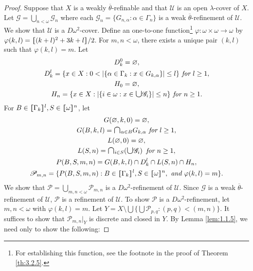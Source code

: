\documentclass[main.tex]{subfiles}
\begin{document}
\begin{proof}
Suppose that $X$ is a weakly $\overline{\theta}$-refinable 
and that $\mathscr{U}$ is an open $\lambda$-cover of $X$. 
Let $\mathscr{G} = \bigcup_{n<\omega} \mathscr{G}_n$ where each 
$\mathscr{G}_n = \{G_{n,\alpha}: \alpha \in \Gamma_n\}$ is a weak 
$\overline{\theta}$-refinement of $\mathscr{U}$.
 We show that $\mathscr{U}$ is a $D\omega^2$-cover. 
 Define an one-to-one function\footnote{For establishing this function, see the footnote 
 	in the proof of Theorem \ref{th:3.2.5}.} 
 $\varphi: \omega \times \omega \to \omega$ by 
 $\varphi(k, l) = \hstretch{1.8}{[}(k+l)^2 +3k+l\hstretch{1.8}{]}/2$.
For $m,n < \omega$, there exists a unique pair $(k, l)$ such that $\varphi(k, l) = m$.
Let
\begin{gather*}
D_k^0 = \varnothing, \\
D_k^l = \{x\in X: 0 < |\{\alpha\in \Gamma_k: x\in G_{k, \alpha}\}| \le l\} \textit { for } l \ge 1, \\
H_0 = \varnothing, \\
H_n = \{x\in X: |\{i \in \omega: x\in \raisebox{-1pt}{\scalebox{1.5}{$\cup$}}\mathscr{G}_i\}| \le n\} 
	  \textit { for } n \ge 1. 
\end{gather*}
For $B\in \hstretch{1.8}{[}\Gamma_k\hstretch{1.8}{]}^l, S\in\hstretch{1.8}{[}\omega\hstretch{1.8}{]}^n$, let
\begin{gather*}
	G(\varnothing, k, 0) = \varnothing, \\
	G(B, k, l) = \raisebox{-1pt}{\scalebox{1.5}{$\cap$}}_{\alpha\in B} G_{k, \alpha} \textit{ for } l \ge 1, \\
	L(\varnothing, 0) = \varnothing, \\
	L(S, n) = \raisebox{-1pt}{\scalebox{1.5}{$\cap$}}_{i\in S} (\raisebox{-1pt}{\scalebox{1.5}{$\cup$}} \mathscr{G}_i) \, \textit{ for } n \ge 1, \\
	P(B, S, m, n) = G(B, k, l) \cap D_k^l \cap L(S, n) \cap H_n, \\
	\mathscr{P}_{m, n} = \{P(B, S, m, n): B\in \hstretch{1.8}{[}\Gamma_k\hstretch{1.8}{]}^l, 
	   S\in\hstretch{1.8}{[}\omega\hstretch{1.8}{]}^n, \textit{ and } \varphi(k, l) = m\}.
\end{gather*}
We show that $\mathscr{P} = \bigcup_{m,n<\omega} \mathscr{P}_{m,n}$ is a 
$D\omega^2$-refinement of $\mathscr{U}$.
 Since $\mathscr{G}$ is a weak $\overline{\theta}$-refinement of $\mathscr{U}$, 
 $\mathscr{P}$ is a refinement of $\mathscr{U}$.
To show $\mathscr{P}$ is a $D\omega^2$-refinement, let $m, n < \omega$ with $\varphi(k, l) = m$.
Let 
$Y = X \setminus \bigcup\{\bigcup \mathscr{P}_{p,q}: (p, q) < (m, n)\}$. 
It suffices to show that $\mathscr{P}_{m,n}|_Y$ is discrete and closed in $Y$. 
By Lemma \ref{lem:1.1.5}, we need only to show the following:


\end{proof}
\end{document}
